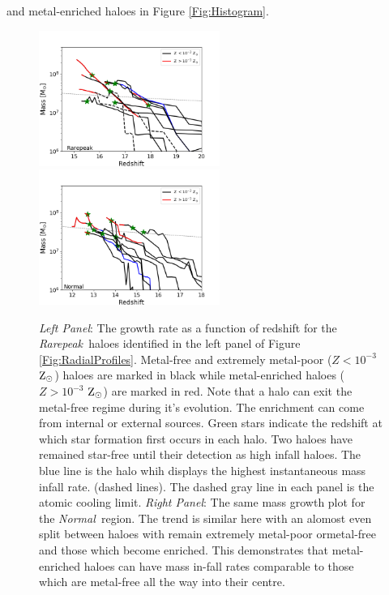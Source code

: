 \documentclass[graphics, twocolumn, usenatbib]{mn2e}
\newcommand{\zsolarc} {$\rm{Z_{\odot}}$}
\newcommand{\rarepeak} {\textit{Rarepeak~}}
\newcommand{\normal} {\textit{Normal~}}
\begin{document}
and metal-enriched haloes in Figure \ref{Fig:Histogram}.
\begin{figure} 
\centering
\begin{minipage}{175mm}      \begin{center} 
\centerline{
\includegraphics[width=0.525\textwidth]{FIGURES/Rarepeak_MassRedshift.png}
\includegraphics[width=0.525\textwidth]{FIGURES/Normal_MassRedshift.png}}
\caption{\textit{Left Panel}: The growth rate as a function of redshift for the \rarepeak haloes
  identified in the left
  panel of Figure \ref{Fig:RadialProfiles}. Metal-free and extremely metal-poor ($Z < 10^{-3}$
  \zsolarc) haloes are marked in black while metal-enriched haloes ($Z > 10^{-3}$ \zsolarc) are
  marked in red. Note that a halo can exit the metal-free regime during it's evolution. The
  enrichment can come from internal or external sources. Green stars indicate the redshift at
  which star formation first occurs in each halo. Two haloes have remained star-free until their
  detection as high infall haloes. The blue line is the halo whih displays  the
  highest instantaneous mass infall rate. 
  (dashed lines). The dashed gray line in each panel is the atomic cooling limit.
  \textit{Right Panel}: The same mass growth plot for the \normal region. The trend is similar
  here with an alomost even split between haloes with remain extremely metal-poor ormetal-free and
  those which become enriched. This demonstrates that metal-enriched haloes can have
  mass in-fall rates comparable to those which are metal-free all the way into their centre. 
}\label{Fig:GrowthRates}
\end{center} \end{minipage}

\end{figure}
\end{document}
